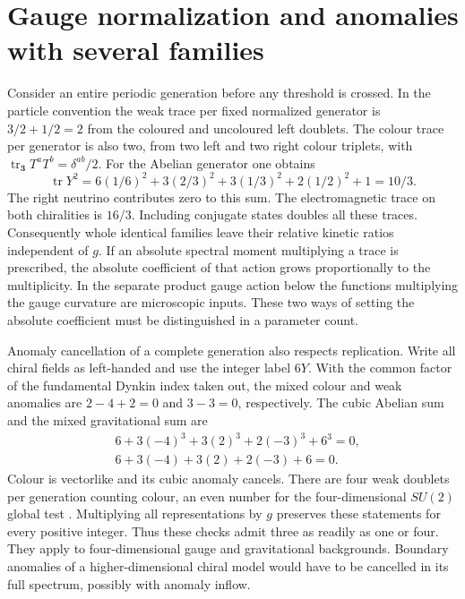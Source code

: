 \documentclass[aps,prd,reprint,onecolumn,nofootinbib,amsmath,amssymb]{revtex4-2}
\begin{document}
\section{Gauge normalization and anomalies with several families}
Consider an entire periodic generation before any threshold is crossed. In the particle convention the weak trace per fixed normalized generator is $3/2+1/2=2$ from the coloured and uncoloured left doublets. The colour trace per generator is also two, from two left and two right colour triplets, with $\operatorname{tr}_{\mathbf3} T^a T^b=\delta^{ab}/2$. For the Abelian generator one obtains
\begin{equation}
 \operatorname{tr}Y^2=
 6(1/6)^2+3(2/3)^2+3(1/3)^2+2(1/2)^2+1
 =10/3 .
\end{equation}
The right neutrino contributes zero to this sum. The electromagnetic trace on both chiralities is $16/3$. Including conjugate states doubles all these traces. Consequently whole identical families leave their relative kinetic ratios independent of $g$. If an absolute spectral moment multiplying a trace is prescribed, the absolute coefficient of that action grows proportionally to the multiplicity. In the separate product gauge action below the functions multiplying the gauge curvature are microscopic inputs. These two ways of setting the absolute coefficient must be distinguished in a parameter count.

Anomaly cancellation of a complete generation also respects replication. Write all chiral fields as left-handed and use the integer label $6Y$. With the common factor of the fundamental Dynkin index taken out, the mixed colour and weak anomalies are $2-4+2=0$ and $3-3=0$, respectively. The cubic Abelian sum and the mixed gravitational sum are
\begin{equation}
\begin{aligned}
 &6+3(-4)^3+3(2)^3+2(-3)^3+6^3=0,\\
 &6+3(-4)+3(2)+2(-3)+6=0 .
\end{aligned}
\end{equation}
Colour is vectorlike and its cubic anomaly cancels. There are four weak doublets per generation counting colour, an even number for the four-dimensional $SU(2)$ global test \cite{Witten1982}. Multiplying all representations by $g$ preserves these statements for every positive integer. Thus these checks admit three as readily as one or four. They apply to four-dimensional gauge and gravitational backgrounds. Boundary anomalies of a higher-dimensional chiral model would have to be cancelled in its full spectrum, possibly with anomaly inflow.
\end{document}
